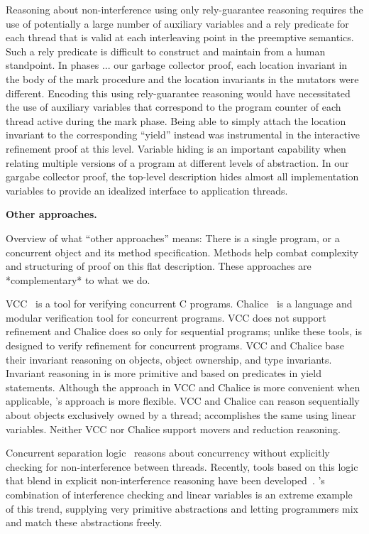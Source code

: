 Reasoning about non-interference using only rely-guarantee reasoning requires the use of potentially a large number of auxiliary variables
and a rely predicate for each thread that is valid at each interleaving point in
the preemptive semantics. 
Such a rely predicate is difficult to construct and maintain from a
human standpoint.
In phases ... our garbage collector proof, each location invariant in
the body of the mark procedure and the location invariants in the
mutators were different. 
Encoding this using rely-guarantee reasoning would have necessitated
the use of auxiliary variables that correspond to the program counter
of each thread active during the mark phase. 
Being able to simply attach the location invariant to the
corresponding ``yield'' instead was instrumental in the interactive
refinement proof at this level. 
Variable hiding
is an important capability when relating multiple versions of a
program at different levels of abstraction. 
In our gargabe collector
proof, the top-level description hides almost all implementation
variables to provide an idealized interface to application threads. 


{\bf Other approaches.}

Overview of what ``other approaches'' means: There is a single
program, or a concurrent object and its method specification. Methods
help combat complexity and structuring of proof on this flat
description. These approaches are *complementary* to what we do.

VCC~\cite{VCC} is a tool for verifying concurrent C programs.  
Chalice~\cite{LM09} is a language and modular verification tool for concurrent programs. 
VCC does not support refinement and Chalice does so only for sequential programs;
unlike these tools, \civl is designed to verify refinement for concurrent programs.  
VCC and Chalice base their invariant reasoning on objects, object ownership, and type invariants. 
Invariant reasoning in \civl is more primitive and based on predicates in yield statements. 
Although the approach in VCC and Chalice is more convenient when applicable, \civl's approach is more flexible. 
VCC and Chalice can reason sequentially about objects exclusively owned by a thread;
\civl accomplishes the same using linear variables.
Neither VCC nor Chalice support movers and reduction reasoning.

Concurrent separation logic~\cite{OHearn07} reasons about concurrency without 
explicitly checking for non-interference between threads. 
Recently, tools based on this logic that blend in explicit non-interference reasoning have been developed~\cite{SAGL,RGSep}. 
\civl's combination of interference checking and linear variables is an extreme example of this trend,
supplying very primitive abstractions and letting programmers mix and
match these abstractions freely.

